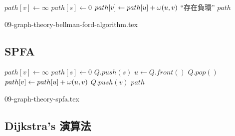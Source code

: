 \documentclass[12pt,a4paper,oneside]{report}
\begin{document}
\begin{CJK}{UTF8}{bkai}
\begin{algorithm}
\caption{Bellman-Ford 演算法}
\label{algo:shortest_path_bellman_ford}
\begin{algorithmic}[1]
  \State{}
    \State $path[v]\gets\infty$
  \EndFor
  \State $path[s]\gets{0}$
        \State $path[v]\gets{path[u]+\omega{\ensuremath{({u},{v})}}}$
      \EndIf
    \EndFor
  \EndFor
      \State \Return ``存在負環''
    \EndIf
  \EndFor
  \State \Return $path$
\EndProcedure
\end{algorithmic}
\end{algorithm}

{09-graph-theory-bellman-ford-algorithm.tex}

\subsection{SPFA}
\begin{algorithm}
\caption{Shortest Path Faster Algorithm (SPFA)}
\label{algo:shortest_path_spfa}
\begin{algorithmic}[1]
  \State{}
    \State $path[v]\gets\infty$
  \EndFor
  \State $path[s]\gets{0}$
  \State $Q.push(s)$
    \State $u\gets{Q.front()}$
    \State $Q.pop()$
        \State $path[v]\gets{path[u]+\omega{\ensuremath{({u},{v})}}}$
          \State $Q.push(v)$
        \EndIf
      \EndIf
    \EndFor
  \EndWhile
  \State \Return $path$
\EndProcedure
\end{algorithmic}
\end{algorithm}

{09-graph-theory-spfa.tex}

\subsection{Dijkstra's 演算法}


\end{CJK}
\end{document}

